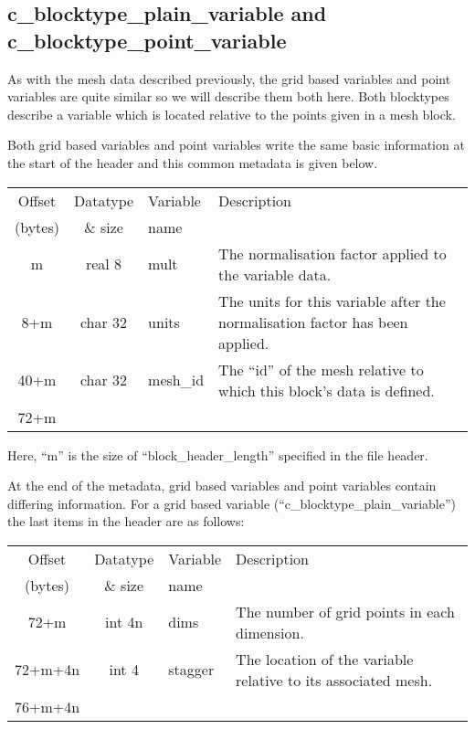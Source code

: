 \documentclass[12pt]{article}
\newcommand{\subsubsec}{\subsection}
\begin{document}
\subsubsec{c\_blocktype\_plain\_variable and c\_blocktype\_point\_variable}

As with the mesh data described previously, the grid based variables and
point variables are quite similar so we will describe them both here.
Both blocktypes describe a variable which is located relative to the points
given in a mesh block.

Both grid based variables and point variables write the same basic information
at the start of the header and this common metadata is given below.\\

\begin{center}
\begin{tabularx}{0.9\textwidth}[!hbt]{cclX}
  Offset & Datatype & Variable & Description\\
  (bytes) & \& size & name &
  \\\toprule

  m & real 8 & mult & The normalisation factor applied to the variable data.
  \\\midrule

  8+m & char 32 & units & The units for this variable after the normalisation
  factor has been applied.
  \\\midrule

  40+m & char 32 & mesh\_id & The ``id'' of the mesh relative to which this
  block's data is defined.
  \\\midrule

  72+m &
\end{tabularx}
\end{center}\vspace{10pt}

Here, ``m'' is the size of ``block\_header\_length'' specified in the file
header.

At the end of the metadata, grid based variables and point variables contain
differing information. For a grid based variable
(``c\_blocktype\_plain\_variable'') the last items in the header are as
follows:\\

\begin{center}
\begin{tabularx}{0.9\textwidth}[!hbt]{cclX}
  Offset & Datatype & Variable & Description\\
  (bytes) & \& size & name &
  \\\toprule

  72+m & int 4n & dims & The number of grid points in each dimension.
  \\\midrule

  72+m+4n & int 4 & stagger & The location of the variable relative to
  its associated mesh.
  \\\midrule

  76+m+4n &
\end{tabularx}
\end{center}\vspace{10pt}
\end{document}

